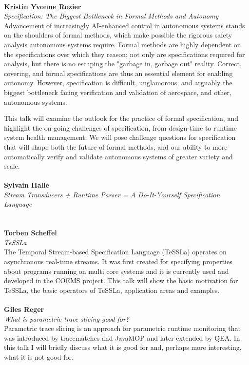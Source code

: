\documentclass{article}
\newcommand{\talk}[3]{
\vspace{0.5em}~\\
\noindent
\textbf{#1}\\ 
\noindent\emph{#2}\\ 
\noindent#3\\
}
\begin{document}
\talk{Kristin Yvonne Rozier} {Specification: The Biggest Bottleneck in Formal Methods and Autonomy}{Advancement of increasingly AI-enhanced control in autonomous systems stands on the shoulders of formal methods, which make possible the rigorous safety analysis autonomous systems require. Formal methods are highly dependent on the specifications over which they reason; not only are specifications required for analysis, but there is no escaping the "garbage in, garbage out" reality. Correct, covering, and formal specifications are thus an essential element for enabling autonomy. However, specification is difficult, unglamorous, and arguably the biggest bottleneck facing verification and validation of aerospace, and other, autonomous systems. 

This talk will examine the outlook for the practice of formal specification, and highlight the on-going challenges of specification, from design-time to runtime system health management. We will pose challenge questions for specification that will shape both the future of formal methods, and our ability to more automatically verify and validate autonomous systems of greater variety and scale. }
\talk{Sylvain Halle}{Stream Transducers + Runtime Parser = A Do-It-Yourself Specification Language}{}
\talk{Torben Scheffel}{TeSSLa}{The Temporal Stream-based Specification Language (TeSSLa) operates on asynchronous real-time streams. It was first created for specifying properties about programs running on multi core systems and it is currently used and developed in the COEMS project. This talk will show the basic motivation for TeSSLa, the basic operators of TeSSLa, application areas and examples.}
\talk{Giles Reger}{What is parametric trace slicing good for?}{Parametric trace slicing is an approach for parametric runtime monitoring that was introduced by tracematches and JavaMOP and later extended by QEA. In this talk I will briefly discuss what it is good for and, perhaps more interesting, what it is not good for.}
\end{document}
